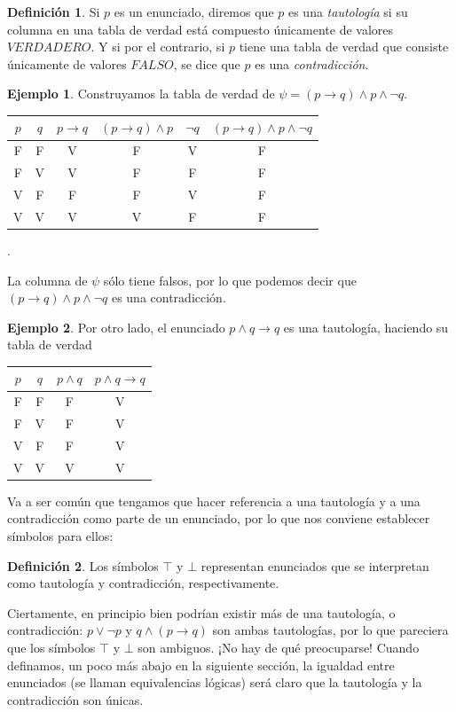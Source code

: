 \documentclass{book}
\theoremstyle{definition}
\newtheorem{df}{Definición}[chapter]
\newtheorem{ejm}{Ejemplo}[chapter]
\begin{document}
\begin{df}
	Si $p$ es un enunciado, diremos que $p$ es una \emph{tautología} si su columna en una tabla de verdad está compuesto únicamente de valores $VERDADERO$.
	Y si por el contrario, si $p$ tiene una tabla de verdad que consiste únicamente de valores $FALSO$, se dice que $p$ es una \emph{contradicción}.
\end{df}

\begin{ejm}
	Construyamos la tabla de verdad de $\psi = (p\rightarrow q)\wedge p \wedge \neg q$.
		\begin{center}\begin{tabular}{|c|c||c|c|c|c|}
			\hline
			$p$ & $q$ & $p\rightarrow q$ & $\left(p\rightarrow q\right)\wedge p$ & $\neg q$& $(p\rightarrow q)\wedge p \wedge \neg q$ \\
			\hline \hline
			F & F & V & F & V & F \\
			\hline
			F & V & V & F & F & F \\
			\hline
			V & F & F & F & V & F \\
			\hline
			V & V & V & V & F & F \\
			\hline
	\end{tabular}.\end{center}
	La columna de $\psi$ sólo tiene falsos, por lo que podemos decir que $(p\rightarrow q)\wedge p \wedge \neg q$ es una contradicción.
\end{ejm}
\begin{ejm}
	Por otro lado, el enunciado $p\wedge q \rightarrow q$ es una tautología, haciendo su tabla de verdad
	\begin{center}\begin{tabular}{|c|c||c|c|}
		\hline
		$p$ & $q$ & $p \wedge q$ & $p\wedge q \rightarrow q$ \\
		\hline\hline
		F & F & F & V \\ \hline
		F & V & F & V \\ \hline
		V & F & F & V \\ \hline
		V & V & V & V \\ \hline
	\end{tabular}\end{center}
\end{ejm}

Va a ser común que tengamos que hacer referencia a una tautología y a una contradicción como parte de un enunciado, por lo que nos conviene establecer símbolos para ellos:
\begin{df}
	Los símbolos $\top$ y $\bot$ representan enunciados que se interpretan como tautología y contradicción, respectivamente.
\end{df}
Ciertamente, en principio bien podrían existir más de una tautología, o contradicción: $p\vee \neg p$ y $q \wedge (p \rightarrow q)$ son ambas tautologías, por lo que pareciera que los símbolos $\top$ y $\bot$ son ambiguos.
¡No hay de qué preocuparse! Cuando definamos, un poco más abajo en la siguiente sección, la igualdad entre enunciados (se llaman equivalencias lógicas) será claro que la tautología y la contradicción son únicas. %
\end{document}
